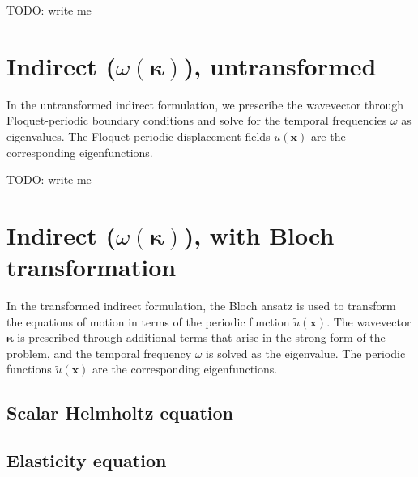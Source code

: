 \documentclass{article}
\newcommand{\vect}[1]{\boldsymbol{#1}}
\newcommand{\x}{x}
\newcommand{\vecx}{\vect{\x}}
\newcommand{\wavenum}{\kappa}
\newcommand{\wavevec}{\vect{\wavenum}}
\newcommand{\kernel}[1]{\tilde{#1}}
\begin{document}
\noindent TODO: write me


\section{Indirect ($\omega(\wavevec)$), untransformed} \label{sec:indirect}

In the untransformed indirect formulation, we prescribe the wavevector through Floquet-periodic boundary conditions and solve for the temporal frequencies \(\omega\) as eigenvalues. The Floquet-periodic displacement fields \(u(\vecx)\) are the corresponding eigenfunctions.

\noindent TODO: write me


\section{Indirect ($\omega(\wavevec)$), with Bloch transformation}
\label{sec:it}

In the transformed indirect formulation, the Bloch ansatz is used to transform the equations of motion in terms of the periodic function \(\kernel{u}(\vecx)\). The wavevector \(\wavevec\) is prescribed through additional terms that arise in the strong form of the problem, and the temporal frequency \(\omega\) is solved as the eigenvalue. The periodic functions \(\kernel{u}(\vecx)\) are the corresponding eigenfunctions.


\subsection{Scalar Helmholtz equation} \label{sec:it.scalar}




\subsection{Elasticity equation} \label{sec:it.vector}

%
\end{document}
